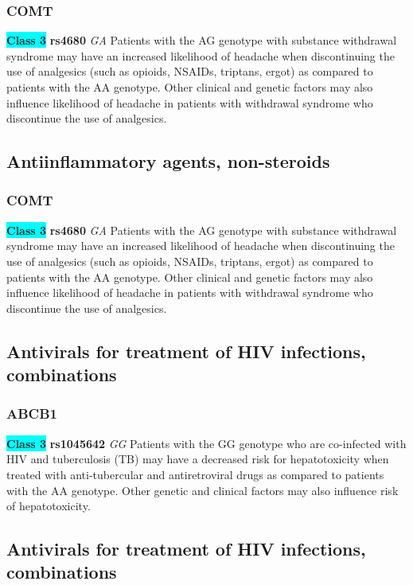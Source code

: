 \documentclass{book}
\begin{document}
\subsubsection{ COMT }

\begin{center}
\textbf{\colorbox{cyan} {Class 3}} \textbf{ rs4680 } \textit{ GA }
Patients with the AG genotype with substance withdrawal syndrome may have an increased likelihood of headache when discontinuing the use of analgesics (such as opioids, NSAIDs, triptans, ergot) as compared to patients with the AA genotype. Other clinical and genetic factors may also influence likelihood of headache in patients with withdrawal syndrome who discontinue the use of analgesics.


\end{center}\subsection{ Antiinflammatory agents, non-steroids }


\subsubsection{ COMT }

\begin{center}
\textbf{\colorbox{cyan} {Class 3}} \textbf{ rs4680 } \textit{ GA }
Patients with the AG genotype with substance withdrawal syndrome may have an increased likelihood of headache when discontinuing the use of analgesics (such as opioids, NSAIDs, triptans, ergot) as compared to patients with the AA genotype. Other clinical and genetic factors may also influence likelihood of headache in patients with withdrawal syndrome who discontinue the use of analgesics.


\end{center}\subsection{ Antivirals for treatment of HIV infections, combinations }


\subsubsection{ ABCB1 }

\begin{center}
\textbf{\colorbox{cyan} {Class 3}} \textbf{ rs1045642 } \textit{ GG }
Patients with the GG genotype who are co-infected with HIV and tuberculosis (TB) may have a decreased risk for hepatotoxicity when treated with anti-tubercular and antiretroviral drugs as compared to patients with the AA genotype. Other genetic and clinical factors may also influence risk of hepatotoxicity.


\end{center}\subsection{ Antivirals for treatment of HIV infections, combinations }
\end{document}
